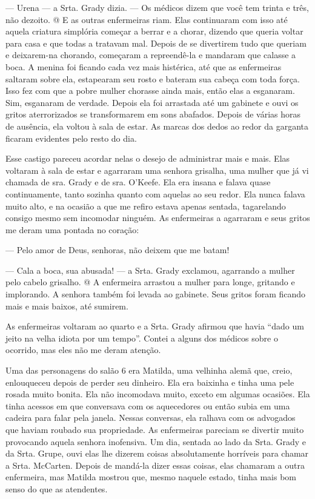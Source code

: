 --- Urena --- a Srta. Grady dizia. --- Os médicos dizem que você tem
trinta e três, não dezoito. @ E as outras enfermeiras riam. Elas
continuaram com isso até aquela criatura simplória começar a berrar e a
chorar, dizendo que queria voltar para casa e que todas a tratavam mal.
Depois de se divertirem tudo que queriam e deixarem-na chorando,
começaram a repreendê-la e mandaram que calasse a boca. A menina foi
ficando cada vez mais histérica, até que as enfermeiras saltaram sobre
ela, estapearam seu rosto e bateram sua cabeça com toda força. Isso fez
com que a pobre mulher chorasse ainda mais, então elas a esganaram. Sim,
esganaram de verdade. Depois ela foi arrastada até um gabinete e ouvi os
gritos aterrorizados se transformarem em sons abafados. Depois de várias
horas de ausência, ela voltou à sala de estar. As marcas dos dedos ao
redor da garganta ficaram evidentes pelo resto do dia.

Esse castigo pareceu acordar nelas o desejo de administrar mais e mais.
Elas voltaram à sala de estar e agarraram uma senhora grisalha, uma
mulher que já vi chamada de sra. Grady e de sra. O'Keefe. Ela era insana
e falava quase continuamente, tanto sozinha quanto com aquelas ao seu
redor. Ela nunca falava muito alto, e na ocasião a que me refiro estava
apenas sentada, tagarelando consigo mesmo sem incomodar ninguém. As
enfermeiras a agarraram e seus gritos me deram uma pontada no coração:

--- Pelo amor de Deus, senhoras, não deixem que me batam!

--- Cala a boca, sua abusada! --- a Srta. Grady exclamou, agarrando a
mulher pelo cabelo grisalho. @ A enfermeira arrastou a mulher para
longe, gritando e implorando. A senhora também foi levada ao gabinete.
Seus gritos foram ficando mais e mais baixos, até sumirem.

As enfermeiras voltaram ao quarto e a Srta. Grady afirmou que havia
``dado um jeito na velha idiota por um tempo''. Contei a alguns dos
médicos sobre o ocorrido, mas eles não me deram atenção.

Uma das personagens do salão 6 era Matilda, uma velhinha alemã que,
creio, enlouqueceu depois de perder seu dinheiro. Ela era baixinha e
tinha uma pele rosada muito bonita. Ela não incomodava muito, exceto em
algumas ocasiões. Ela tinha acessos em que conversava com os aquecedores
ou então subia em uma cadeira para falar pela janela. Nessas conversas,
ela ralhava com os advogados que haviam roubado sua propriedade. As
enfermeiras pareciam se divertir muito provocando aquela senhora
inofensiva. Um dia, sentada ao lado da Srta. Grady e da Srta. Grupe,
ouvi elas lhe dizerem coisas absolutamente horríveis para chamar a Srta.
McCarten. Depois de mandá-la dizer essas coisas, elas chamaram a outra
enfermeira, mas Matilda mostrou que, mesmo naquele estado, tinha mais
bom senso do que as atendentes.

